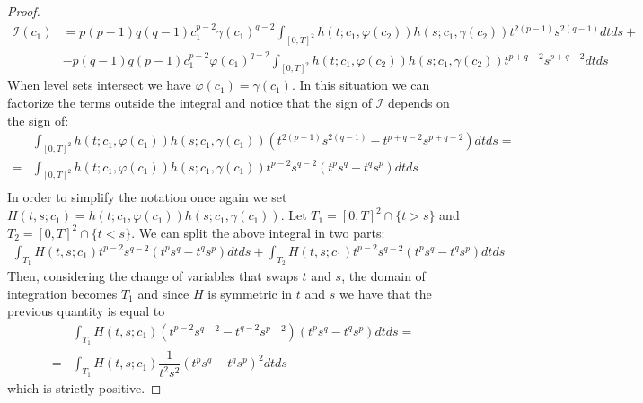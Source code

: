 \documentclass[corpo=11pt, stile=classica, tipotesi=custom,
greek, evenboxes, english]{toptesi}
\numberwithin{equation}{chapter}
\theoremstyle{remark}
\begin{document}
\begin{proof}
\begin{equation*}
	\begin{split}
		\mathcal{I}(c_1) &=p(p-1)q(q-1)c_1^{p-2}\gamma(c_1)^{q-2} \int_{[0,T]^2} h(t;c_1,\varphi(c_2)) h(s;c_1,\gamma(c_2)) t^{2(p-1)} s^{2(q-1)} dtds +\\ &-p(q-1)q(p-1)c_1^{p-2}\varphi(c_1)^{q-2} \int_{[0,T]^2} h(t;c_1,\varphi(c_2)) h(s;c_1,\gamma(c_2)) t^{p+q-2} s^{p+q-2} dtds
	\end{split}
\end{equation*}
When level sets intersect we have $\varphi(c_1)=\gamma(c_1)$. In this situation we can factorize the terms outside the integral and notice that the sign of $\mathcal{I}$ depends on the sign of:
\begin{equation*}
	\begin{split}
		&\int_{[0,T]^2} h(t;c_1,\varphi(c_1)) h(s;c_1,\gamma(c_1))\left( t^{2(p-1)} s^{2(q-1)} - t^{p+q-2} s^{p+q-2} \right)dtds=\\
		=&\int_{[0,T]^2} h(t;c_1,\varphi(c_1)) h(s;c_1,\gamma(c_1)) t^{p-2}s^{q-2}\left( t^p s^q - t^q s^p \right)dtds\\
	\end{split}
\end{equation*}
In order to simplify the notation once again we set $H(t,s;c_1) = h(t;c_1,\varphi(c_1)) h(s;c_1,\gamma(c_1))$. Let $T_1 = [0,T]^2 \cap \{t>s\}$ and $T_2 = [0,T]^2 \cap \{t<s\}$. We can split the above integral in two parts:
\begin{equation*}
	\begin{split}
		\int_{T_1} H(t,s;c_1)t^{p-2}s^{q-2}\left( t^p s^q - t^q s^p \right)dtds + \int_{T_2} H(t,s;c_1)t^{p-2}s^{q-2}\left( t^p s^q - t^q s^p \right)dtds
	\end{split}
\end{equation*}
Then, considering the change of variables that swaps $t$ and $s$, the domain of integration becomes $T_1$ and since $H$ is symmetric in $t$ and $s$ we have that the previous quantity is equal to
\begin{equation*}
	\begin{split}
		&\int_{T_1} H(t,s;c_1)\left( t^{p-2} s^{q-2} - t^{q-2} s^{p-2} \right) \left( t^p s^q - t^q s^p \right)dtds =\\
		=& \int_{T_1} H(t,s;c_1)\dfrac{1}{t^2 s^2}\left( t^p s^q - t^q s^p \right)^2 dtds
	\end{split}
\end{equation*}
which is strictly positive.


\end{proof}
\end{document}
